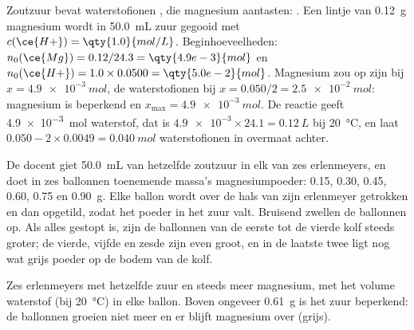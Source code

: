 \begin{example}\label{ex:g10:reaction-progress-table:magnesium}
Zoutzuur bevat waterstofionen , die magnesium aantasten:
. Een lintje van \qty{0.12}{g} magnesium
wordt in \qty{50.0}{mL} zuur gegooid met $c(\ce{H+}) = \qty{1.0}{mol/L}$.
Beginhoeveelheden: $n_0(\ce{Mg}) = 0.12/24.3 = \qty{4.9e-3}{mol}$ en
$n_0(\ce{H+}) = 1.0 \times 0.0500 = \qty{5.0e-2}{mol}$. Magnesium zou op
zijn bij $x = \qty{4.9e-3}{mol}$, de waterstofionen bij
$x = 0.050/2 = \qty{2.5e-2}{mol}$: magnesium is beperkend en
$x_{\max} = \qty{4.9e-3}{mol}$. De reactie geeft \qty{4.9e-3}{mol}
waterstof, dat is $\num{4.9e-3} \times 24.1 = \qty{0.12}{L}$ bij
\qty{20}{\celsius}, en laat $0.050 - 2 \times 0.0049 =
\qty{0.040}{mol}$ waterstofionen in overmaat achter.
\end{example}

\begin{inthelab}
De docent giet \qty{50.0}{mL} van hetzelfde zoutzuur in elk van zes
erlenmeyers, en doet in zes ballonnen toenemende massa's
magnesiumpoeder: 0.15, 0.30, 0.45, 0.60, 0.75 en \qty{0.90}{g}. Elke
ballon wordt over de hals van zijn erlenmeyer getrokken en dan opgetild,
zodat het poeder in het zuur valt. Bruisend zwellen de ballonnen op. Als
alles gestopt is, zijn de ballonnen van de eerste tot de vierde kolf
steeds groter; de vierde, vijfde en zesde zijn even groot, en in de
laatste twee ligt nog wat grijs poeder op de bodem van de kolf.
\end{inthelab}

\begin{omfigure}

{\small Zes erlenmeyers met hetzelfde zuur en steeds meer magnesium, met
het volume waterstof (bij \qty{20}{\celsius}) in elke ballon. Boven
ongeveer \qty{0.61}{g} is het zuur beperkend: de ballonnen groeien niet
meer en er blijft magnesium over (grijs).}
\end{omfigure}

